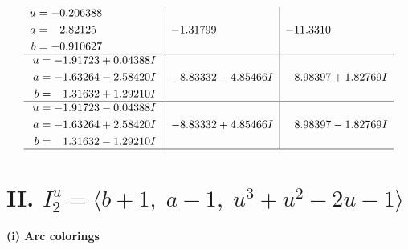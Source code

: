 \documentclass[1p]{elsarticle_modified}
\theoremstyle{definition}
\begin{document}
$$\begin{array}{c|c|c}
\begin{aligned}
u &= -0.206388\phantom{ +0.000000I} \\
a &= \phantom{-}2.82125\phantom{ +0.000000I} \\
b &= -0.910627\phantom{ +0.000000I}\end{aligned}
 & -1.31799\phantom{ +0.000000I} & -11.3310\phantom{ +0.000000I} \\ \hline\begin{aligned}
u &= -1.91723 + 0.04388 I \\
a &= -1.63264 - 2.58420 I \\
b &= \phantom{-}1.31632 + 1.29210 I\end{aligned}
 & -8.83332 - 4.85466 I & \phantom{-}8.98397 + 1.82769 I \\ \hline\begin{aligned}
u &= -1.91723 - 0.04388 I \\
a &= -1.63264 + 2.58420 I \\
b &= \phantom{-}1.31632 - 1.29210 I\end{aligned}
 & -8.83332 + 4.85466 I & \phantom{-}8.98397 - 1.82769 I\\
 \hline 
 \end{array}$$\newpage\newpage\renewcommand{\arraystretch}{1}
\centering \section*{II. $I^u_{2}= \langle b+1,\;a-1,\;u^3+u^2-2 u-1 \rangle$}
\flushleft \textbf{(i) Arc colorings}\\
\end{document}
